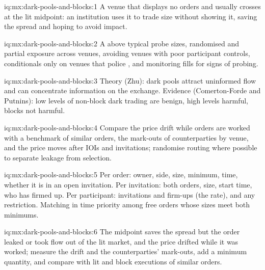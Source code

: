 \begin{solution}{iq:mx:dark-pools-and-blocks:1}
A venue that displays no orders and usually crosses at the lit midpoint: an institution uses it to trade size without showing it, saving the spread and
hoping to avoid impact.
\end{solution}

\begin{solution}{iq:mx:dark-pools-and-blocks:2}
A  above typical probe sizes, randomised and partial exposure across venues, avoiding venues with poor participant controls,
conditionals only on venues that police , and monitoring fills for signs of probing.
\end{solution}

\begin{solution}{iq:mx:dark-pools-and-blocks:3}
Theory (Zhu): dark pools attract uninformed flow and can concentrate information on the exchange. Evidence (Comerton-Forde and Putnins): low levels of
non-block dark trading are benign, high levels harmful, blocks not harmful.
\end{solution}

\begin{solution}{iq:mx:dark-pools-and-blocks:4}
Compare the price drift while orders are worked with a benchmark of similar orders, the mark-outs of counterparties by venue, and the price moves after
IOIs and invitations; randomise routing where possible to separate leakage from selection.
\end{solution}

\begin{solution}{iq:mx:dark-pools-and-blocks:5}
Per order: owner, side, size, minimum, time, whether it is in an open invitation. Per invitation: both orders, size, start time, who has firmed up. Per
participant: invitations and firm-ups (the rate), and any restriction. Matching in time priority among free orders whose sizes meet both minimums.
\end{solution}

\begin{solution}{iq:mx:dark-pools-and-blocks:6}
The midpoint saves the spread but the order leaked or took flow out of the lit market, and the price drifted while it was worked; measure the drift and
the counterparties' mark-outs, add a minimum quantity, and compare with lit and block executions of similar orders.
\end{solution}
